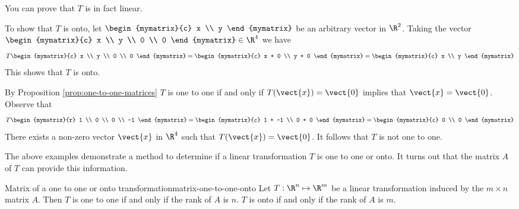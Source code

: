 \begin{solution} 
You can prove that $T$ is in fact linear. 

To show that $T$ is onto, let $\begin{mymatrix}{c} 
x \\
y
\end{mymatrix}$ be an arbitrary vector in $\R^2$. Taking the vector $\begin{mymatrix}{c}
x \\
y \\
0 \\
0 
\end{mymatrix} \in \R^4$ we have 
\[
T \begin{mymatrix}{c}
x \\
y \\
0 \\
0
\end{mymatrix} = 
\begin{mymatrix}{c}
x + 0 \\
y + 0 
\end{mymatrix}
= \begin{mymatrix}{c}
x \\
y 
\end{mymatrix}
\]
This shows that $T$ is onto. 

By Proposition \ref{prop:one-to-one-matrices} $T$ is one to one if and only if $T(\vect{x}) = \vect{0}$ implies that $\vect{x} = \vect{0}$. Observe that 
\[
T \begin{mymatrix}{r}
1 \\
0 \\
0 \\
-1
\end{mymatrix} = 
\begin{mymatrix}{c}
1 + -1 \\
0 + 0 
\end{mymatrix}
= \begin{mymatrix}{c}
0 \\
0 
\end{mymatrix}
\]
There exists a non-zero vector $\vect{x}$ in $\R^4$ such that $T(\vect{x}) = \vect{0}$. It follows that $T$ is not one to one.
\end{solution}

The above examples demonstrate a method to determine if a linear transformation $T$ is one to one or onto. It turns out that the matrix $A$ of $T$ can provide this information.

\begin{theorem}{Matrix of a one to one or onto transformation}{matrix-one-to-one-onto}
Let $T: \R^n \mapsto \R^m$ be a linear transformation induced by the $m \times n$ matrix $A$. Then $T$ is one to one if and only if the rank of $A$ is $n$. $T$ is onto if and only if the rank of $A$ is $m$. 
\end{theorem}

